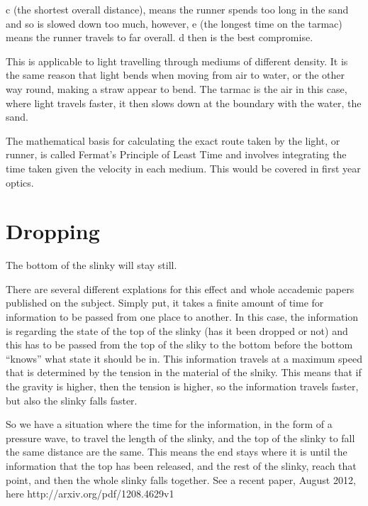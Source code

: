 c (the shortest overall distance), means the runner spends too long in the sand and so is slowed down too much, however, e (the longest time on the tarmac) means the runner travels to far overall. d then is the best compromise.

This is applicable to light travelling through mediums of different density. It is the same reason that light bends when moving from air to water, or the other way round, making a straw appear to bend. The tarmac is the air in this case, where light travels faster, it then slows down at the boundary with the water, the sand.

The mathematical basis for calculating the exact route taken by the light, or runner, is called Fermat's Principle of Least Time and involves integrating the time taken given the velocity in each medium. This would be covered in first year optics.

\section{Dropping}
The bottom of the slinky will stay still. 

There are several different explations for this effect and whole accademic papers published on the subject. Simply put, it takes a finite amount of time for information to be passed from one place to another. In this case, the information is regarding the state of the top of the slinky (has it been dropped or not) and this has to be passed from the top of the sliky to the bottom before the bottom ``knows'' what state it should be in. This information travels at a maximum speed that is determined by the tension in the material of the slniky. This means that if the gravity is higher, then the tension is higher, so the information travels faster, but also the slinky falls faster.

So we have a situation where the time for the information, in the form of a pressure wave, to travel the length of the slinky, and the top of the slinky to fall the same distance are the same. This means the end stays where it is until the information that the top has been released, and the rest of the slinky, reach that point, and then the whole slinky falls together. See a recent paper, August 2012, here http://arxiv.org/pdf/1208.4629v1

